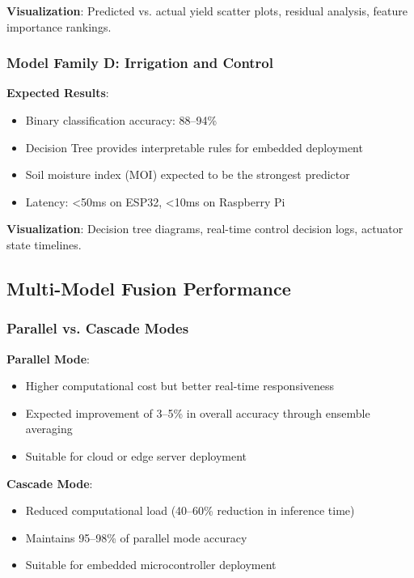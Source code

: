\documentclass[conference]{IEEEtran}
\begin{document}
\textbf{Visualization}: Predicted vs. actual yield scatter plots, residual analysis, feature importance rankings.

\subsubsection{Model Family D: Irrigation and Control}

\textbf{Expected Results}:
\begin{itemize}
\item Binary classification accuracy: 88--94\%
\item Decision Tree provides interpretable rules for embedded deployment
\item Soil moisture index (MOI) expected to be the strongest predictor
\item Latency: <50ms on ESP32, <10ms on Raspberry Pi
\end{itemize}

\textbf{Visualization}: Decision tree diagrams, real-time control decision logs, actuator state timelines.

\subsection{Multi-Model Fusion Performance}

\subsubsection{Parallel vs. Cascade Modes}

\textbf{Parallel Mode}:
\begin{itemize}
\item Higher computational cost but better real-time responsiveness
\item Expected improvement of 3--5\% in overall accuracy through ensemble averaging
\item Suitable for cloud or edge server deployment
\end{itemize}

\textbf{Cascade Mode}:
\begin{itemize}
\item Reduced computational load (40--60\% reduction in inference time)
\item Maintains 95--98\% of parallel mode accuracy
\item Suitable for embedded microcontroller deployment
\end{itemize}
\end{document}
